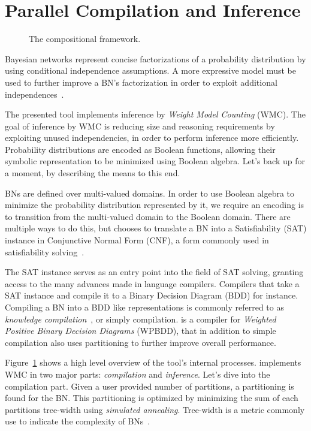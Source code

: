 

\section{Parallel Compilation and Inference}
\label{secjjparallel}

\begin{figure}[!t]
    \centering
    \scalebox{0.6}{
        
    }
    \caption{The compositional framework.}
    \label{fig:frameworkoverview}
\end{figure}

Bayesian networks represent concise factorizations of a probability distribution by using conditional independence assumptions. A more expressive model must be used to further improve a BN's factorization in order to exploit additional independences~\cite{zhang1996exploiting,boutilier1996context,friedman1998learning}.  

The presented tool implements inference by \emph{Weight Model Counting} (WMC). The goal of inference by WMC is reducing size and reasoning requirements by exploiting unused independencies, in order to perform inference more efficiently. Probability distributions are encoded as Boolean functions, allowing their symbolic representation to be minimized using Boolean algebra. Let's back up for a moment, by describing the means to this end. 

BNs are defined over multi-valued domains. In order to use Boolean algebra to minimize the probability distribution represented by it, we require an encoding is to transition from the multi-valued domain to the Boolean domain. There are multiple ways to do this, but \toolname chooses to translate a BN into a Satisfiability (SAT) instance in Conjunctive Normal Form (CNF), a form commonly used in satisfiability solving~\cite{dal2017wpbdd}. 

The SAT instance serves as an entry point into the field of SAT solving, granting access to the many advances made in language compilers. Compilers that take a SAT instance and compile it to a Binary Decision Diagram (BDD) for instance. Compiling a BN into a BDD like representations is commonly referred to as \emph{knowledge compilation}~\cite{darwiche2002knowledge}, or simply compilation. \toolname is a compiler for \emph{Weighted Positive Binary Decision Diagrams} (WPBDD), that in addition to simple compilation also uses partitioning to further improve overall performance.

Figure~\ref{fig:frameworkoverview} shows a high level overview of the tool's internal processes. \toolname implements WMC in two major parts: \emph{compilation} and \emph{inference}. Let's dive into the compilation part. Given a user provided number of partitions, a partitioning is found for the BN. This partitioning is optimized by minimizing the sum of each partitions tree-width using \emph{simulated annealing}. Tree-width is a metric commonly use to indicate the complexity of BNs~\cite{bollig2014width}.

